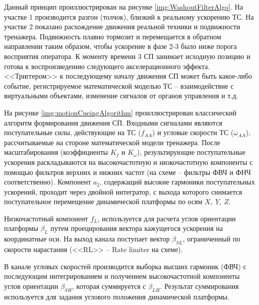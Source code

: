 Данный принцип проиллюстрирован на рисунке \ref{img:WashoutFilterAlgo}. На участке 1 производится разгон (толчок), близкий к реальному ускорению ТС. На участке 2 показано расхождение движения реальной техники и подвижности тренажера. Подвижность плавно тормозит и перемещается в обратном направлении таким образом, чтобы ускорение в фазе 2-3 было ниже порога восприятия оператора. К моменту времени 3 СП занимает исходную позицию и готова к воспроизведению следующего акселерационного эффекта. <<Триггером>> к последующему началу движения СП может быть какое-либо событие, регистрируемое математической моделью ТС -- взаимодействие с виртуальными объектами, изменение сигналов от  органов управления и т.д.

На рисунке \ref{img:motionCueingAlgorithm} проиллюстрирован классический алгоритм формирования движения СП. Входными сигналами являются поступательные силы, действующие на ТС ($f_{AA}$) и угловые скорости ТС ($\omega_{AA}$), рассчитываемые на стороне математической модели тренажера. После масштабирования (коэффициенты $K_f$ и $K_{\omega}$), результирующие поступательные ускорения раскладываются на высокочастотную и низкочастотную компоненты с помощью фильтров верхних и нижних частот (на схеме -- фильтры ФВЧ и ФНЧ соответственно). Компонент $a_2$, содержащий высокие гармоники поступательных ускорений, проходит через двойной интегратор, с выхода которого снимается поступательное перемещение динамической платформы по осям $X,~Y,~Z$.

Низкочастотный компонент $f_{L}$, используется для расчета углов ориентации платформы $\beta_{L}$ путем проецирования вектора кажущегося ускорения на координатные оси. На выход канала поступает вектор $\beta_{SL}$, ограниченный по скорости нарастания (<<RL>> -- Rate limiter на схеме).

В канале угловых скоростей  производится выборка высших гармоник (ФВЧ) с последующим интегрированием и получением высокочастотной компоненты углов ориентации $\beta_{SH}$, которая суммируется с $\beta_{LH}$. Результат суммирования используется для задания углового положения динамической платформы.


